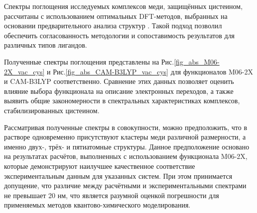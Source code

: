 \documentclass[a4paper,12pt]{article}
\newcommand{\ths}{\thinspace}
\begin{document}
\begin{onehalfspace}

	Спектры поглощения исследуемых комплексов меди, защищённых цистеином, рассчитаны с использованием оптимальных DFT-методов, выбранных на основании предварительного анализа структур . Такой подход позволил обеспечить согласованность методологии и сопоставимость результатов для различных типов лигандов.
	
	Полученные спектры поглощения представлены на Рис.\ths\ref{fig_abs_M06-2X_vac_cys} и Рис.\ths\ref{fig_abs_CAM-B3LYP_vac_cys} для функционалов M06-2X и CAM-B3LYP соответственно. Сравнение этих данных позволяет оценить влияние выбора функционала на описание электронных переходов, а также выявить общие закономерности в спектральных характеристиках комплексов, стабилизированных цистеином.
	
	
	Рассматривая полученные спектры в совокупности, можно предположить, что в растворе одновременно присутствуют кластеры меди различной размерности, а именно двух-, трёх- и пятиатомные структуры. Данное предположение основано на результатах расчётов, выполненных с использованием функционала M06-2X, которые демонстрируют наилучшее качественное соответствие экспериментальным данным для указанных систем. При этом принимается допущение, что различие между расчётными и экспериментальными спектрами не превышает 20 нм, что является разумной оценкой погрешности для применяемых методов квантово-химического моделирования.
	

\end{onehalfspace}
\end{document}
